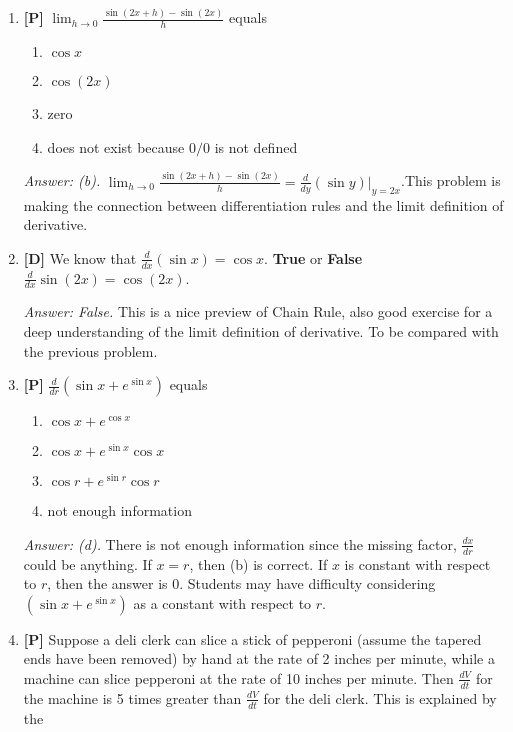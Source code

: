 \documentclass[12pt]{article}
\begin{document}
\begin{enumerate}
\bigskip

\item {\bf [P]} $\displaystyle{\lim_{h\rightarrow 0}\frac{\sin (2x+h)-\sin (2x)}{h}}$ equals
\begin {enumerate}
\item $\cos x$
\item $\cos (2x)$
\item zero
\item does not exist because $0/0$ is not defined
\end{enumerate}

{\it Answer: (b).} $\displaystyle{\lim_{h\rightarrow 0}\frac{\sin (2x+h)-\sin (2x)}{h}=\frac{d}{dy}(\sin y)|_{y=2x}}$.This problem is making the connection between differentiation rules and the limit definition of derivative.

\bigskip

\item {\bf [D]} We know that $\displaystyle{\frac{d}{dx}(\sin x)=\cos x}$. 
\textbf{True} or \textbf{False}  $\displaystyle{\frac{d}{dx}\sin (2x)=\cos (2x)}$.

{\it Answer: False.} This is a nice preview of Chain Rule, also good exercise for a deep understanding of the limit definition of derivative. To be compared with the previous problem.

\bigskip

\item {\bf [P]} $\frac{d}{dr}(\sin x + e^{\sin x})$ equals
\begin {enumerate}
\item $\cos x + e^{\cos x}$
\item $\cos x + e^{\sin x}\cos x$
\item $\cos r + e^{\sin r}\cos r$
\item not enough information
\end {enumerate}

{\it Answer: (d).} There is not enough information since the missing
factor, $\frac{dx}{dr}$ could be anything.  If $x=r$, then (b) is
correct.  If $x$ is constant with respect to $r$, then the answer
is $0$.  Students may have difficulty considering $(\sin x + e^{\sin x})$
as a constant with respect to $r$.


\bigskip

\item {\bf [P]}
Suppose a deli clerk can slice a stick of pepperoni (assume the tapered
ends have been removed) by hand at the rate of 2 inches per minute, 
while a machine can 
slice pepperoni at the rate of 10 inches per minute.  Then 
$\frac{dV}{dt}$ for the machine is 5 times greater than 
$\frac{dV}{dt}$ for the deli clerk.  This is explained by the


\end{enumerate}
\end{document}
